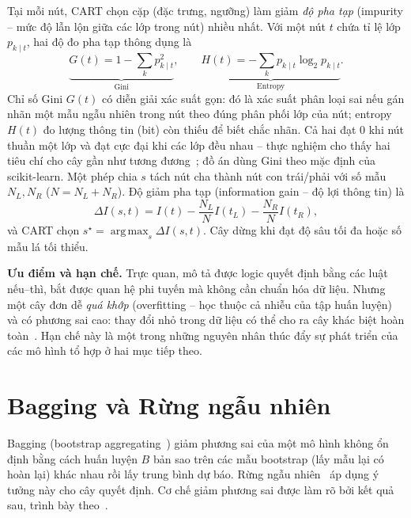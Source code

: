 \documentclass[12pt,a4paper,oneside]{report}
\theoremstyle{vnplain}
\theoremstyle{vndef}
\DeclareMathOperator*{\argmax}{arg\,max}
\begin{document}
Tại mỗi nút, CART chọn cặp (đặc trưng, ngưỡng) làm giảm \emph{độ pha tạp} (impurity --
mức độ lẫn lộn giữa các lớp trong nút) nhiều nhất. Với một nút $t$ chứa tỉ lệ lớp
$p_{k\mid t}$, hai độ đo pha tạp thông dụng là
\begin{equation}
  \underbrace{G(t)=1-\sum_{k}p_{k\mid t}^2}_{\text{Gini}},
  \qquad
  \underbrace{H(t)=-\sum_{k}p_{k\mid t}\log_2 p_{k\mid t}}_{\text{Entropy}}.
  \label{eq:gini}
\end{equation}
Chỉ số Gini $G(t)$ có diễn giải xác suất gọn: đó là xác suất phân loại sai nếu gán nhãn
một mẫu ngẫu nhiên trong nút theo đúng phân phối lớp của nút; entropy $H(t)$ đo lượng
thông tin (bit) còn thiếu để biết chắc nhãn. Cả hai đạt $0$ khi nút thuần một lớp và đạt
cực đại khi các lớp đều nhau -- thực nghiệm cho thấy hai tiêu chí cho cây gần như tương
đương~\cite[Ch.~9.2.3]{hastie2009}; đồ án dùng Gini theo mặc định của scikit-learn.
Một phép chia $s$ tách nút cha thành nút con trái/phải với số mẫu $N_L,N_R$ ($N=N_L+N_R$).
Độ giảm pha tạp (information gain -- độ lợi thông tin) là
\begin{equation}
  \Delta I(s,t)=I(t)-\frac{N_L}{N}I(t_L)-\frac{N_R}{N}I(t_R),
  \label{eq:gain}
\end{equation}
và CART chọn $s^\star=\argmax_s \Delta I(s,t)$. Cây dừng khi đạt độ sâu tối đa hoặc số mẫu
lá tối thiểu.

\noindent\textbf{Ưu điểm và hạn chế.} Trực quan, mô tả được logic quyết định bằng các
luật nếu--thì, bắt được quan hệ phi tuyến mà không cần chuẩn hóa dữ liệu. Nhưng một cây
đơn dễ \emph{quá khớp} (overfitting -- học thuộc cả nhiễu của tập huấn luyện) và có phương
sai cao: thay đổi nhỏ trong dữ liệu có thể cho ra cây khác biệt hoàn toàn~\cite[Ch.~8.7]{hastie2009}.
Hạn chế này là một trong những nguyên nhân thúc đẩy sự phát triển của các mô hình tổ hợp ở hai mục tiếp theo.

\section{Bagging và Rừng ngẫu nhiên}\label{sec:rf}
Bagging (bootstrap aggregating~\cite{breiman1996}) giảm phương sai của một mô hình không
ổn định bằng cách huấn luyện $B$ bản sao trên các mẫu bootstrap (lấy mẫu lại có hoàn lại)
khác nhau rồi lấy trung bình dự báo. Rừng ngẫu nhiên~\cite{breiman2001} áp dụng ý tưởng
này cho cây quyết định. Cơ chế giảm phương sai được làm rõ bởi kết quả sau, trình bày
theo~\cite[Ch.~15.2]{hastie2009}.
\end{document}
